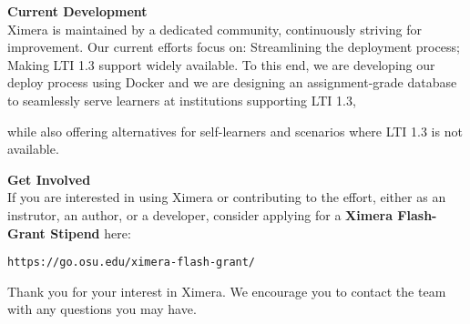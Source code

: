 \documentclass{article}
\begin{document}
\begin{multicols}{2}
    \begin{xframe}
        {\sffamily\bfseries Current Development}\\
        Ximera is maintained by a dedicated community, continuously striving
        for
        improvement. Our current efforts focus on: Streamlining the deployment
        process; Making LTI 1.3 support widely available. To this end, we are
        developing our
        deploy process using Docker and we are designing an assignment-grade
        database
        to
        seamlessly serve  learners at institutions supporting LTI 1.3,
        \begin{center}
        \end{center}
        while also offering alternatives for self-learners and scenarios where
        LTI
        1.3 is not
        available.
    \end{xframe}
    \begin{xframe}
        {\sffamily\bfseries Get Involved}\\
        If you are interested in using Ximera or contributing to the effort,
        either
        as an instrutor, an author, or a developer, consider
        applying for a \textbf{Ximera Flash-Grant Stipend} here:
        \begin{center}
            \tt  https://go.osu.edu/ximera-flash-grant/
        \end{center}
        Thank you for your interest in Ximera. We encourage you
        to contact the team with  any questions you may have.
    \end{xframe}
\end{multicols}
\end{document}
